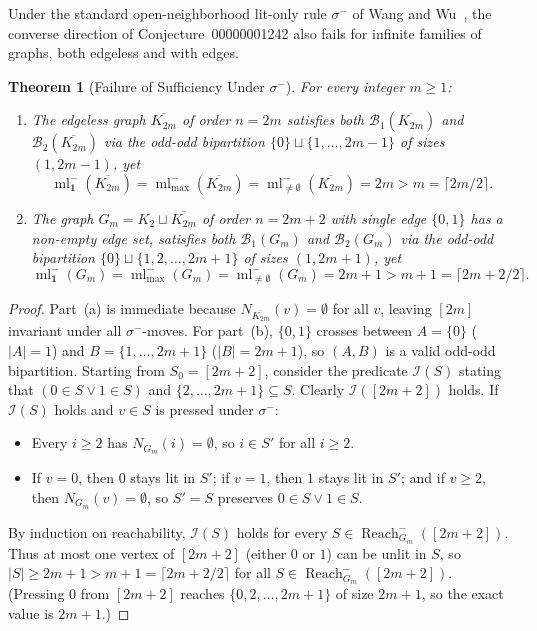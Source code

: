\documentclass[11pt,a4paper]{article}
\newtheorem{theorem}{Theorem}[section]
\theoremstyle{definition}
\newcommand{\ml}{\operatorname{ml}}
\newcommand{\Reach}{\operatorname{Reach}}
\newcommand{\ceilhalf}[1]{\lceil #1 / 2 \rceil}
\begin{document}
Under the standard open-neighborhood lit-only rule $\sigma^-$ of Wang and
Wu~\cite{WangWu2006}, the converse direction of Conjecture~00000001242 also fails
for infinite families of graphs, both edgeless and with edges.

\begin{theorem}[Failure of Sufficiency Under $\sigma^-$]
\label{thm:converse}
For every integer $m \ge 1$:
\begin{enumerate}
\item[(a)] The edgeless graph $\overline{K_{2m}}$ of order $n = 2m$ satisfies both
$\mathcal{B}_1(\overline{K_{2m}})$ and $\mathcal{B}_2(\overline{K_{2m}})$ via the
odd-odd bipartition $\{0\} \sqcup \{1, \dots, 2m-1\}$ of sizes $(1, 2m-1)$, yet
\[
\ml_{\mathbf{1}}^-(\overline{K_{2m}}) = \ml_{\max}^-(\overline{K_{2m}})
= \ml_{\neq\emptyset}^-(\overline{K_{2m}}) = 2m > m = \ceilhalf{2m}.
\]
\item[(b)] The graph $G_m = K_2 \sqcup \overline{K_{2m}}$ of order $n = 2m + 2$ with
single edge $\{0, 1\}$ has a non-empty edge set, satisfies both $\mathcal{B}_1(G_m)$
and $\mathcal{B}_2(G_m)$ via the odd-odd bipartition $\{0\} \sqcup \{1, 2, \dots, 2m+1\}$
of sizes $(1, 2m+1)$, yet
\[
\ml_{\mathbf{1}}^-(G_m) = \ml_{\max}^-(G_m) = \ml_{\neq\emptyset}^-(G_m)
= 2m + 1 > m + 1 = \ceilhalf{2m + 2}.
\]
\end{enumerate}
\end{theorem}

\begin{proof}
Part~(a) is immediate because $N_{\overline{K_{2m}}}(v) = \emptyset$ for all $v$,
leaving $[2m]$ invariant under all $\sigma^-$-moves. For part~(b), $\{0, 1\}$ crosses
between $A = \{0\}$ ($|A| = 1$) and $B = \{1, \dots, 2m+1\}$ ($|B| = 2m+1$), so
$(A, B)$ is a valid odd-odd bipartition. Starting from $S_0 = [2m+2]$, consider the
predicate $\mathcal{I}(S)$ stating that $(0 \in S \lor 1 \in S)$ and
$\{2, \dots, 2m+1\} \subseteq S$. Clearly $\mathcal{I}([2m+2])$ holds. If $\mathcal{I}(S)$
holds and $v \in S$ is pressed under $\sigma^-$:
\begin{itemize}
\item Every $i \ge 2$ has $N_{G_m}(i) = \emptyset$, so $i \in S'$ for all $i \ge 2$.
\item If $v = 0$, then $0$ stays lit in $S'$; if $v = 1$, then $1$ stays lit in $S'$;
and if $v \ge 2$, then $N_{G_m}(v) = \emptyset$, so $S' = S$ preserves $0 \in S \lor 1 \in S$.
\end{itemize}
By induction on reachability, $\mathcal{I}(S)$ holds for every $S \in \Reach_{G_m}^-([2m+2])$.
Thus at most one vertex of $[2m+2]$ (either $0$ or $1$) can be unlit in $S$, so
$|S| \ge 2m + 1 > m + 1 = \ceilhalf{2m+2}$ for all $S \in \Reach_{G_m}^-([2m+2])$.
(Pressing $0$ from $[2m+2]$ reaches $\{0, 2, \dots, 2m+1\}$ of size $2m + 1$, so the
exact value is $2m + 1$.)
\end{proof}
\end{document}
